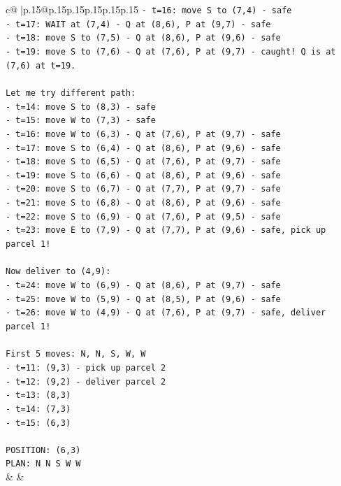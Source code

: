 \documentclass{article}
\begin{document}
{\begin{supertabular}{c@{$\;$}|p{.15\linewidth}@{}p{.15\linewidth}p{.15\linewidth}p{.15\linewidth}p{.15\linewidth}p{.15\linewidth}}
{{{\texttt{{-} t=16: move S to (7,4) {-} safe} \\
\texttt{{-} t=17: WAIT at (7,4) {-} Q at (8,6), P at (9,7) {-} safe} \\
\texttt{{-} t=18: move S to (7,5) {-} Q at (8,6), P at (9,6) {-} safe} \\
\texttt{{-} t=19: move S to (7,6) {-} Q at (7,6), P at (9,7) {-} caught! Q is at (7,6) at t=19.} \\
\\ 
\texttt{Let me try different path:} \\
\texttt{{-} t=14: move S to (8,3) {-} safe} \\
\texttt{{-} t=15: move W to (7,3) {-} safe} \\
\texttt{{-} t=16: move W to (6,3) {-} Q at (7,6), P at (9,7) {-} safe} \\
\texttt{{-} t=17: move S to (6,4) {-} Q at (8,6), P at (9,6) {-} safe} \\
\texttt{{-} t=18: move S to (6,5) {-} Q at (7,6), P at (9,7) {-} safe} \\
\texttt{{-} t=19: move S to (6,6) {-} Q at (8,6), P at (9,6) {-} safe} \\
\texttt{{-} t=20: move S to (6,7) {-} Q at (7,7), P at (9,7) {-} safe} \\
\texttt{{-} t=21: move S to (6,8) {-} Q at (8,6), P at (9,6) {-} safe} \\
\texttt{{-} t=22: move S to (6,9) {-} Q at (7,6), P at (9,5) {-} safe} \\
\texttt{{-} t=23: move E to (7,9) {-} Q at (7,7), P at (9,6) {-} safe, pick up parcel 1!} \\
\\ 
\texttt{Now deliver to (4,9):} \\
\texttt{{-} t=24: move W to (6,9) {-} Q at (8,6), P at (9,7) {-} safe} \\
\texttt{{-} t=25: move W to (5,9) {-} Q at (8,5), P at (9,6) {-} safe} \\
\texttt{{-} t=26: move W to (4,9) {-} Q at (7,6), P at (9,7) {-} safe, deliver parcel 1!} \\
\\ 
\texttt{First 5 moves: N, N, S, W, W} \\
\texttt{{-} t=11: (9,3) {-} pick up parcel 2} \\
\texttt{{-} t=12: (9,2) {-} deliver parcel 2} \\
\texttt{{-} t=13: (8,3)} \\
\texttt{{-} t=14: (7,3)} \\
\texttt{{-} t=15: (6,3)} \\
\\ 
\texttt{POSITION: (6,3)} \\
\texttt{PLAN: N N S W W} \\
            }
        }
    }
    & & \\ \\


\end{supertabular}}
\end{document}
